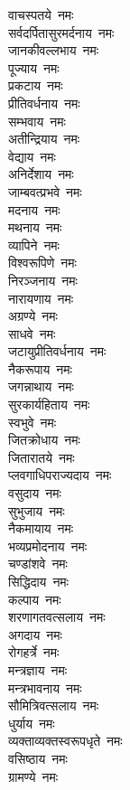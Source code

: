 \begin{multicols}{2}
\begin{flushleft}
वाचस्पतये~नमः\\
सर्वदर्पितासुरमर्दनाय~नमः\\
जानकीवल्लभाय~नमः\hfill{}\\
पूज्याय~नमः\\
प्रकटाय~नमः\\
प्रीतिवर्धनाय~नमः\\
सम्भवाय~नमः\\
अतीन्द्रियाय~नमः\\
वेद्याय~नमः\\
अनिर्देशाय~नमः\\
जाम्बवत्प्रभवे~नमः\\
मदनाय~नमः\\
मथनाय~नमः\hfill{}\\
व्यापिने~नमः\\
विश्वरूपिणे~नमः\\
निरञ्जनाय~नमः\\
नारायणाय~नमः\\
अग्रण्ये~नमः\\
साधवे~नमः\\
जटायुप्रीतिवर्धनाय~नमः\\
नैकरूपाय~नमः\\
जगन्नाथाय~नमः\\
सुरकार्यहिताय~नमः\hfill{}\\
स्वभुवे~नमः\\
जितक्रोधाय~नमः\\
जितारातये~नमः\\
प्लवगाधिपराज्यदाय~नमः\\
वसुदाय~नमः\\
सुभुजाय~नमः\\
नैकमायाय~नमः\\
भव्यप्रमोदनाय~नमः\\
चण्डांशवे~नमः\\
सिद्धिदाय~नमः\hfill{}\\
कल्पाय~नमः\\
शरणागतवत्सलाय~नमः\\
अगदाय~नमः\\
रोगहर्त्रे~नमः\\
मन्त्रज्ञाय~नमः\\
मन्त्रभावनाय~नमः\\
सौमित्रिवत्सलाय~नमः\\
धुर्याय~नमः\\
व्यक्ताव्यक्तस्वरूपधृते~नमः\\
वसिष्ठाय~नमः\hfill{}\\
ग्रामण्ये~नमः\\

\end{flushleft}
\end{multicols}
